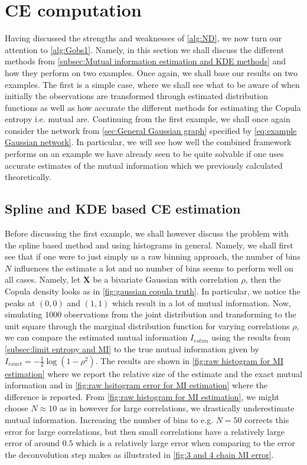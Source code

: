 \documentclass[../Thesis.tex]{subfiles}
\begin{document}
\section{CE computation}\label{sec:gaussian MI error}
Having discussed the strengths and weaknesses of \autoref{alg:ND}, we now turn our attention to \autoref{alg:Gobs1}. Namely, in this section we shall discuss the different methods from \autoref{subsec:Mutual information estimation and KDE methods} and how they perform on two examples. Once again, we shall base our results on two examples. The first is a simple case, where we shall see what to be aware of when initially the observations are transformed through estimated distribution functions as well as how accurate the different methods for estimating the Copula entropy i.e. mutual are. Continuing from the first example, we shall once again consider the network from \autoref{sec:General Gaussian graph} specified by \autoref{eq:example Gaussian network}. In particular, we will see how well the combined framework performs on an example we have already seen to be quite solvable if one uses accurate estimates of the mutual information which we previously calculated theoretically.



\subsection{Spline and KDE based CE estimation}
Before discussing the first example, we shall however discuss the problem with the spline based method and using histograms in general. Namely, we shall first see that if one were to just simply us a raw binning approach, the number of bins $N$ influences the estimate a lot and no number of bins seems to perform well on all cases. Namely, let $\boldsymbol X$ be a bivariate Gaussian with correlation $\rho$, then the Copula density looks as in \autoref{fig:gaussian copula truth}. In particular, we notice the peaks at $(0,0)$ and $(1,1)$ which result in a lot of mutual information. Now, simulating $1000$ observations from the joint distribution and transforming to the unit square through the marginal distribution function for varying correlations $\rho$, we can compare the estimated mutual information $I_{estim}$ using the results from \autoref{subsec:limit entropy and MI} to the true mutual information given by $ I_{exact} = - \frac{1}{2} \log \left(1 - \rho^2\right)$. The results are shown in \autoref{fig:raw histogram for MI estimation} where we report the relative size of the estimate and the exact mutual information and in \autoref{fig:raw hsitogram error for MI estimation} where the difference is reported. From \autoref{fig:raw histogram for MI estimation}, we might choose $N \approx 10$ as in \cite{Network-deconvolution-as-a-general-method-to-distinguish-direct-dependencies-in-networks} however for large correlations, we drastically underestimate mutual information. Increasing the number of bins to e.g. $N = 50$ corrects this error for large correlations, but then small correlations have a relatively large error of around $0.5$ which is a relatively large error when comparing to the error the deconvolution step makes as illustrated in \autoref{fig:3 and 4 chain MI error}.
\end{document}
